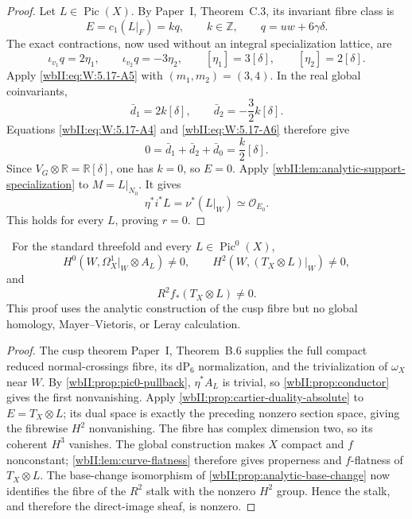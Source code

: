 \begin{proof}
Let \(L\in\operatorname{Pic}(X)\).  By
Paper~I, Theorem~C.3, its invariant fibre class is
\[
 E=c_1(L|_F)=kq,
 \qquad k\in\mathbb Z,
 \qquad q=uw+6\gamma\delta.
\tag{W.138}\label{wbII:eq:W:5.17-A35}
\]
The exact contractions, now used without an integral specialization
lattice, are
\[
 \iota_{v_1}q=2\eta_1,
 \qquad
 \iota_{v_2}q=-3\eta_2,
 \qquad
 [\eta_1]=3[\delta],
 \qquad
 [\eta_2]=2[\delta].
\tag{W.139}\label{wbII:eq:W:5.17-A36}
\]
Apply \eqref{wbII:eq:W:5.17-A5} with \((m_1,m_2)=(3,4)\).  In the real global
coinvariants,
\[
 \bar d_1=2k[\delta],
 \qquad
 \bar d_2=-\frac32k[\delta].
\tag{W.140}\label{wbII:eq:W:5.17-A37}
\]
Equations \eqref{wbII:eq:W:5.17-A4} and \eqref{wbII:eq:W:5.17-A6} therefore give
\[
 0=\bar d_1+\bar d_2+\bar d_0
   =\frac{k}{2}[\delta].
\tag{W.141}\label{wbII:eq:W:5.17-A38}
\]
Since \(V_G\otimes\mathbb R=\mathbb R[\delta]\), one has \(k=0\), so
\(E=0\).  Apply \cref{wbII:lem:analytic-support-specialization} to
\(M=L|_{N_0}\).  It gives
\[
 \eta^*i^*L=\nu^*(L|_W)\simeq\mathcal O_{E_0}.
\]
This holds for every \(L\), proving \(r=0\).
\end{proof}


\begin{corollary}
\label{wbII:cor:candidate-pic0-route}
\ For the standard threefold and every
$L\in\operatorname{Pic}^0(X)$,
\[
 H^0(W,\Omega_X^1|_W\otimes A_L)\ne0,
 \qquad
 H^2(W,(T_X\otimes L)|_W)\ne0,
\]
and
\[
 R^2f_*(T_X\otimes L)\ne0.
\tag{W.44}\label{wbII:eq:W:5.17f}
\]
This proof uses the analytic construction of the cusp fibre but no global
homology, Mayer--Vietoris, or Leray calculation.
\end{corollary}

\begin{proof}
The cusp theorem Paper~I, Theorem~B.6 supplies the full compact
reduced normal-crossings fibre, its $\mathrm{dP}_6$ normalization, and the
trivialization of $\omega_X$ near $W$.  By
\cref{wbII:prop:pic0-pullback}, $\eta^*A_L$ is trivial, so
\cref{wbII:prop:conductor} gives the first nonvanishing.  Apply
\cref{wbII:prop:cartier-duality-absolute} to $E=T_X\otimes L$; its dual space is
exactly the preceding nonzero section space, giving the fibrewise $H^2$
nonvanishing.  The fibre has complex dimension two, so its coherent
$H^3$ vanishes.  The global construction makes $X$ compact and $f$
nonconstant; \cref{wbII:lem:curve-flatness} therefore gives properness and
$f$-flatness of $T_X\otimes L$.  The base-change isomorphism of
\cref{wbII:prop:analytic-base-change} now identifies the fibre of the $R^2$
stalk with the nonzero $H^2$ group.  Hence the stalk, and therefore the
direct-image sheaf, is nonzero.
\end{proof}


